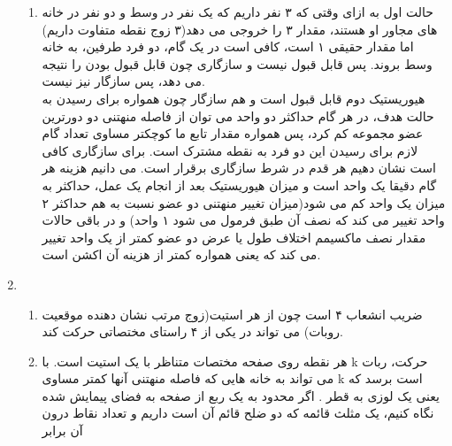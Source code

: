 \documentclass[11pt]{article}
\begin{document}
\begin{enumerate}
\begin{enumerate}
		 \item
		 حالت اول به ازای وقتی که ۳ نفر داریم که یک نفر در وسط و دو نفر در خانه های مجاور او هستند، مقدار ۳ را خروجی می دهد(۳ زوج نقطه متفاوت داریم) اما مقدار حقیقی ۱ است، کافی است در یک گام، دو فرد طرفین، به خانه وسط بروند. پس قابل قبول نیست و سازگاری چون قابل قبول بودن را نتیجه می دهد، پس سازگار نیز نیست.\\
		 هیوریستیک دوم قابل قبول است و هم سازگار چون همواره برای رسیدن به حالت هدف، در هر گام حداکثر دو واحد می توان از فاصله منهتنی دو دورترین عضو مجموعه کم کرد، پس همواره مقدار تابع ما کوچکتر مساوی تعداد گام لازم برای رسیدن این دو فرد به نقطه مشترک است. برای سازگاری کافی است نشان دهیم هر قدم در شرط سازگاری برقرار است. می دانیم هزینه هر گام دقیقا یک واحد است و میزان هیوریستیک بعد از انجام یک عمل، حداکثر به میزان یک واحد کم می شود(میزان تغییر منهتنی دو عضو نسبت به هم حداکثر ۲ واحد تغییر می کند که نصف آن طبق فرمول می شود ۱ واحد) و در باقی حالات مقدار نصف ماکسیمم اختلاف طول یا عرض دو عضو کمتر از یک واحد تغییر می کند که یعنی همواره کمتر از هزینه آن اکشن است.\\
		 
		
		\end{enumerate}
	\item
	\begin{enumerate}
		\item
		ضریب انشعاب ۴ است چون از هر استیت(زوج مرتب نشان دهنده موقعیت روبات) می تواند در یکی از ۴ راستای مختصاتی حرکت کند.\\
		\item
		هر نقطه روی صفحه مختصات متناظر با یک استیت است.
		با k حرکت، ربات می تواند به خانه هایی که فاصله منهتنی آنها کمتر مساوی k است برسد که یعنی یک لوزی به قطر 
		.
		 اگر محدود به یک ربع از صفحه به فضای پیمایش شده نگاه کنیم، یک مثلث قائمه که دو ضلح قائم آن 
		  است داریم و تعداد نقاط درون آن برابر\\
		  

\end{enumerate}
\end{enumerate}
\end{document}
